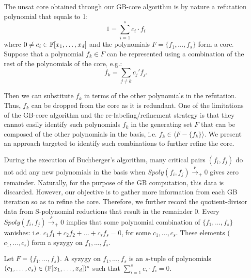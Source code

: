 
The unsat core obtained through our GB-core algorithm is by nature a
refutation polynomial that equals to 1:  
$$1 = \sum_{i=1}^s c_i\cdot f_i$$
where $0 \neq c_i \in {\mathbb{F}}[x_1,\dots,x_d]$ and the polynomials
$F = \{f_1,\dots,f_s\}$ form a core. Suppose that a polynomial 
$f_k \in F$ can be represented using a combination of the rest of the
polynomials of the core, e.g.:
$$f_k = \sum_{j\neq k} c_j'f_j.$$

Then we can substitute $f_k$ in terms of the other polynomials in the
refutation. Thus, $f_k$ can be dropped from the core as it is 
redundant. One of the limitations of the GB-core algorithm and the
re-labeling/refinement strategy is that they cannot easily identify
such polynomials $f_k$ in the generating set $F$ that can be composed
of the other polynomials in the basis, i.e. 
$f_k \in \langle F-\{f_k\} \rangle$. We present an approach targeted
to identify such combinations to further refine the core. 
 
 
During the execution of Buchberger's algorithm, many critical pairs
$(f_i,f_j)$ do not add any new polynomials in the basis when
$Spoly(f_i,f_j)\xrightarrow{F}_+0$ gives zero remainder. Naturally,
for the purpose of the GB computation, this data is
discarded. However, our objective is to gather more information from
each GB iteration so as to refine the core. Therefore, we further
record the quotient-divisor data from S-polynomial reductions that
result in the remainder 0. Every $Spoly(f_i,f_j)\xrightarrow{F}_+0$
implies that some polynomial combination of $\{f_1,\dots,f_s\}$
vanishes: i.e. $c_1f_1 + c_2f_2 + \dots+c_sf_s=0$, for some
$c_1,\dots,c_s$. These elements ($c_1,\dots,c_s$) form a syzygy on $f_1,\dots,f_s$. 

\begin{Definition}
Let $F = \{f_1,\dots,f_s\}$. A syzygy on $f_1,\dots,f_s$ is an
$s$-tuple of polynomials $(c_1,\dots,c_s)\in ({\mathbb{F}}[x_1,\dots,x_d])^s$
such that $\sum_{i=1}^s c_i\cdot f_i = 0$.
\end{Definition}

